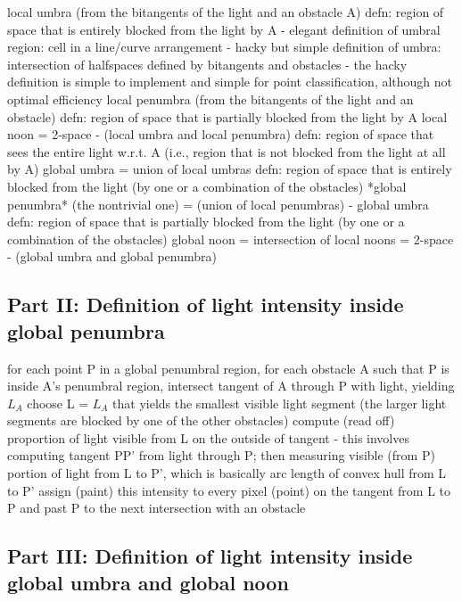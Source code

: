 \documentclass[9pt]{article}
\begin{document}
local umbra 
	(from the bitangents of the light and an obstacle A)
	defn: region of space that is entirely blocked from the light by A
	- elegant definition of umbral region: cell in a line/curve arrangement
	- hacky but simple definition of umbra: intersection of halfspaces defined
		by bitangents and obstacles
	- the hacky definition is simple to implement and simple for point 
		classification, although not optimal efficiency
local penumbra 
	(from the bitangents of the light and an obstacle)
	defn: region of space that is partially blocked from the light by A
local noon
	= 2-space - (local umbra and local penumbra)
	defn: region of space that sees the entire light w.r.t. A
		(i.e., region that is not blocked from the light at all by A)
global umbra 
	= union of local umbras
	defn: region of space that is entirely blocked from the light 
	      (by one or a combination of the obstacles)
*global penumbra*	(the nontrivial one)
	= (union of local penumbras) - global umbra
	defn: region of space that is partially blocked from the light 
	      (by one or a combination of the obstacles)
global noon
	= intersection of local noons
	= 2-space - (global umbra and global penumbra)
	
			
\subsection{Part II: Definition of light intensity inside global penumbra}

for each point P in a global penumbral region,
  for each obstacle A such that P is inside A's penumbral region,
	intersect tangent of A through P with light, yielding $L_A$
  choose L = $L_A$ that yields the smallest visible light segment
	(the larger light segments are blocked by one of the other obstacles)
  compute (read off) proportion of light visible from L on the
	outside of tangent
	   - this involves computing tangent PP' from light 
	     through P; then measuring visible (from P) portion of 
	     light from L to P', which is basically arc length
	     of convex hull from L to P'
  assign (paint) this intensity to every pixel (point) on 
	     the tangent from L to P and past P to the next 
	     intersection with an obstacle

			
\subsection{Part III: Definition of light intensity inside global umbra and global noon}
\end{document}
